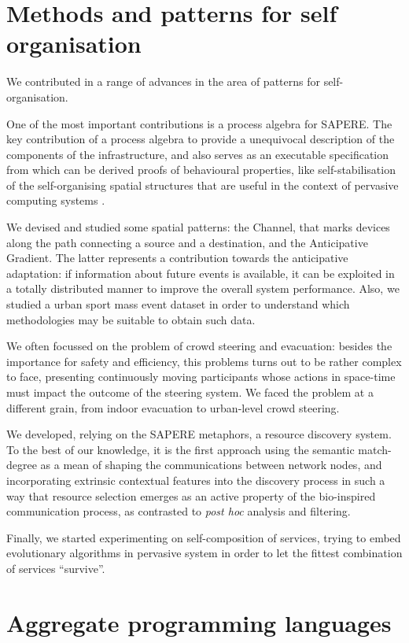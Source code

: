 \documentclass[12pt,a4paper,twoside,openright]{book}
\begin{document}
\section{Methods and patterns for self organisation}

We contributed in a range of advances in the area of patterns for self-organisation.

One of the most important contributions is a process algebra for SAPERE. The key contribution of a process algebra to provide a unequivocal description of the components of the infrastructure, and also serves as an executable specification from which can be derived proofs of behavioural properties, like self-stabilisation of the self-organising spatial structures that are useful in the context of pervasive computing systems \cite{V-SCW2013}.

We devised and studied some spatial patterns: the Channel, that marks devices along the path connecting a source and a destination, and the Anticipative Gradient.
%
The latter represents a contribution towards the anticipative adaptation: if information about future events is available, it can be exploited in a totally distributed manner to improve the overall system performance.
%
Also, we studied a urban sport mass event dataset in order to understand which methodologies may be suitable to obtain such data.

We often focussed on the problem of crowd steering and evacuation: besides the importance for safety and efficiency, this problems turns out to be rather complex to face, presenting continuously moving participants whose actions in space-time must impact the outcome of the steering system.
%
We faced the problem at a different grain, from indoor evacuation to urban-level crowd steering.

We developed, relying on the SAPERE metaphors, a resource discovery system.
%
To the best of our knowledge, it is the first approach using the semantic match-degree as a mean of shaping the communications between network nodes, and incorporating extrinsic contextual features into the discovery process in such a way that resource selection emerges as an active property of the bio-inspired communication process, as contrasted to \emph{post hoc} analysis and filtering.

Finally, we started experimenting on self-composition of services, trying to embed evolutionary algorithms in pervasive system in order to let the fittest combination of services ``survive''.

\section{Aggregate programming languages}
\end{document}
